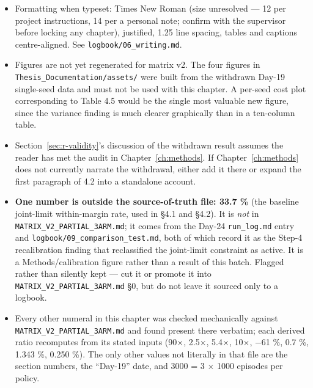 \begin{draftonly}
\begin{itemize}
\tightlist
\item
  Formatting when typeset: Times New Roman (size unresolved --- 12 per project instructions, 14 per
  a personal note; confirm with the supervisor before locking any chapter), justified, 1.25 line
  spacing, tables and captions centre-aligned. See \texttt{logbook/06\_writing.md}.
\item
  Figures are not yet regenerated for matrix v2. The four figures in
  \texttt{Thesis\_Documentation/assets/} were built from the withdrawn Day-19 single-seed data and must
  not be used with this chapter. A per-seed cost plot corresponding to Table 4.5 would be the
  single most valuable new figure, since the variance finding is much clearer graphically than in
  a ten-column table.
\item
  Section~\ref{sec:r-validity}'s discussion of the withdrawn result assumes the reader has met the audit in
  Chapter~\ref{ch:methods}. If Chapter~\ref{ch:methods} does not currently narrate the withdrawal, either add it there or expand
  the first paragraph of 4.2 into a standalone account.
\item
  \textbf{One number is outside the source-of-truth file: 33.7 \%} (the baseline joint-limit
  within-margin rate, used in \S{}4.1 and \S{}4.2). It is \emph{not} in \texttt{MATRIX\_V2\_PARTIAL\_3ARM.md}; it comes
  from the Day-24 \texttt{run\_log.md} entry and \texttt{logbook/09\_comparison\_test.md}, both of which record it
  as the Step-4 recalibration finding that reclassified the joint-limit constraint as active.
  It is a Methods/calibration figure rather than a result of this batch. Flagged rather than
  silently kept --- cut it or promote it into \texttt{MATRIX\_V2\_PARTIAL\_3ARM.md} \S{}0, but do not leave it
  sourced only to a logbook.
\item
  Every other numeral in this chapter was checked mechanically against
  \texttt{MATRIX\_V2\_PARTIAL\_3ARM.md} and found present there verbatim; each derived ratio recomputes from
  its stated inputs (90\(\times\), 2.5\(\times\), 5.4\(\times\), 10\(\times\), \(-\)61 \%, 0.7 \%, 1.343 \%, 0.250 \%). The only other values
  not literally in that file are the section numbers, the ``Day-19'' date, and 3000 = 3 \(\times\) 1000
  episodes per policy.
\end{itemize}

\end{draftonly}
